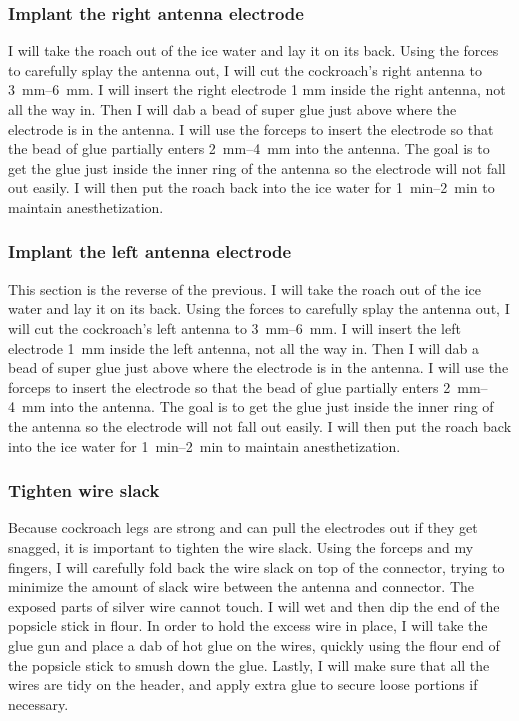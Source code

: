 \subsubsection{Implant the right antenna electrode}
I will take the roach out of the ice water and lay it on its back. Using the forces to carefully splay the antenna out, I will cut the cockroach's right antenna to \SIrange{3}{6}{\milli\meter}. I will insert the right electrode 1 mm inside the right antenna, not all the way in. Then I will dab a bead of super glue just above where the electrode is in the antenna. I will use the forceps to insert the electrode so that the bead of glue partially enters \SIrange{2}{4}{\milli\meter} into the antenna. The goal is to get the glue just inside the inner ring of the antenna so the electrode will not fall out easily. I will then put the roach back into the ice water for \SIrange{1}{2}{\minute} to maintain anesthetization.

\subsubsection{Implant the left antenna electrode}
This section is the reverse of the previous. I will take the roach out of the ice water and lay it on its back. Using the forces to carefully splay the antenna out, I will cut the cockroach's left antenna to \SIrange{3}{6}{\milli\meter}. I will insert the left electrode \SI{1}{\milli\meter} inside the left antenna, not all the way in. Then I will dab a bead of super glue just above where the electrode is in the antenna. I will use the forceps to insert the electrode so that the bead of glue partially enters \SIrange{2}{4}{\milli\meter} into the antenna. The goal is to get the glue just inside the inner ring of the antenna so the electrode will not fall out easily. I will then put the roach back into the ice water for \SIrange{1}{2}{\minute} to maintain anesthetization.

\subsubsection{Tighten wire slack}
Because cockroach legs are strong and can pull the electrodes out if they get snagged, it is important to tighten the wire slack. Using the forceps and my fingers, I will carefully fold back the wire slack on top of the connector, trying to minimize the amount of slack wire between the antenna and connector. The exposed parts of silver wire cannot touch. I will wet and then dip the end of the popsicle stick in flour. In order to hold the excess wire in place, I will take the glue gun and place a dab of hot glue on the wires, quickly using the flour end of the popsicle stick to smush down the glue. Lastly, I will make sure that all the wires are tidy on the header, and apply extra glue to secure loose portions if necessary.

